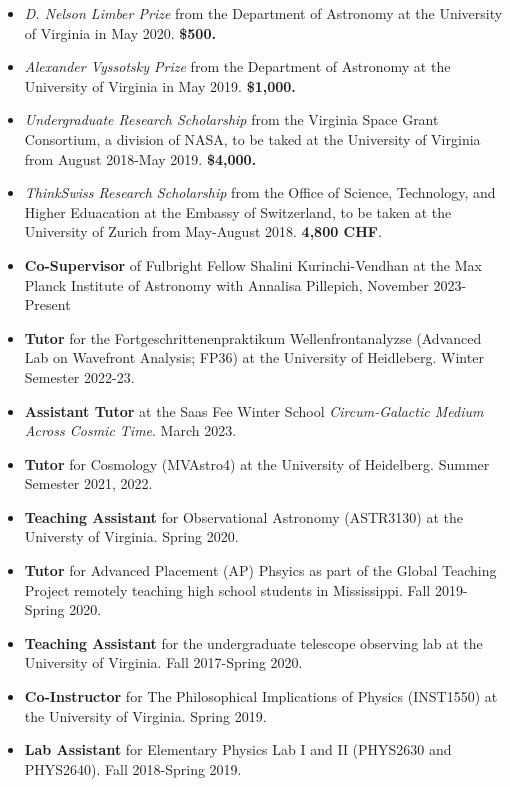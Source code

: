 \documentclass[a4paper,10pt,oneside]{article}
\begin{document}
\noindent{}

\begin{itemize}[wide, labelwidth=!, labelindent=-11pt, parsep=0pt]
    \item {\it D. Nelson Limber Prize} from the Department of Astronomy at the University of Virginia in May 2020. {\bf \$500.}
    \item {\it Alexander Vyssotsky Prize} from the Department of Astronomy at the University of Virginia in May 2019. {\bf \$1,000.}
    \item {\it Undergraduate Research Scholarship} from the Virginia Space Grant Consortium, a division of NASA, to be taked at the University of Virginia from August 2018-May 2019. {\bf \$4,000.} 
    \item {\it ThinkSwiss Research Scholarship} from the Office of Science, Technology, and Higher Eduacation at the Embassy of Switzerland, to be taken at the University of Zurich from May-August 2018. {\bf 4,800 CHF}.
\end{itemize}

\noindent{}

\begin{itemize}[wide, labelwidth=!, labelindent=-11pt, parsep=0pt]
    \item {\bf Co-Supervisor} of Fulbright Fellow Shalini Kurinchi-Vendhan at the Max Planck Institute of Astronomy with Annalisa Pillepich, November 2023-Present
    \item {\bf Tutor} for the Fortgeschrittenenpraktikum Wellenfrontanalyzse (Advanced Lab on Wavefront Analysis; FP36) at the University of Heidleberg. Winter Semester 2022-23.
    \item {\bf Assistant Tutor} at the Saas Fee Winter School {\it Circum-Galactic Medium Across Cosmic Time}. March 2023. 
    \item {\bf Tutor} for Cosmology (MVAstro4) at the University of Heidelberg. Summer Semester 2021, 2022.
    \item {\bf Teaching Assistant} for Observational Astronomy (ASTR3130) at the Universty of Virginia. Spring 2020.
    \item {\bf Tutor} for Advanced Placement (AP) Phsyics as part of the Global Teaching Project remotely teaching high school students in Mississippi. Fall 2019-Spring 2020.
    \item {\bf Teaching Assistant} for the undergraduate telescope observing lab at the University of Virginia. Fall 2017-Spring 2020. 
    \item {\bf Co-Instructor} for The Philosophical Implications of Physics (INST1550) at the University of Virginia. Spring 2019.
    \item {\bf Lab Assistant} for Elementary Physics Lab I and II (PHYS2630 and PHYS2640). Fall 2018-Spring 2019. 
\end{itemize}
\end{document}
